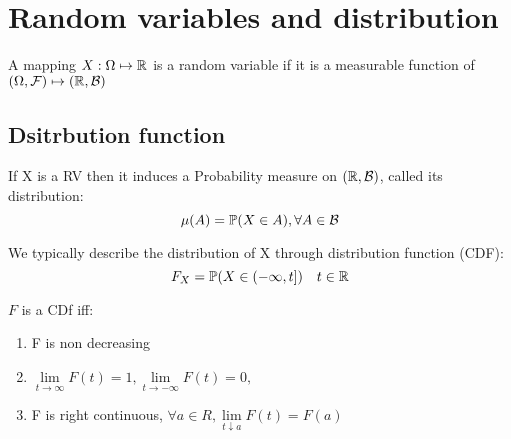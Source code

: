 \newpage
\section{Random variables and distribution}
\begin{dfn}
A mapping $X: \Omega \mapsto \mathbb{R}$ is a random variable if it is a measurable function of $(\Omega, \mathcal{F}) \mapsto (\mathbb{R}, \mathcal{B})$
\end{dfn}
\subsection{Dsitrbution function}
\begin{dfn}
If X is a RV then it induces a Probability measure on $(\mathbb{R}, \mathcal{B})$, called its distribution: 
\begin{equation*}
    \mu(A)=  \mathbb{P}(X\in A), \forall A\in \mathcal{B}
\end{equation*}
\end{dfn}
We typically describe the distribution of X through distribution function (CDF):
\begin{equation*}
    F_X = \mathbb{P}(X \in (-\infty, t]) \quad t\in \mathbb{R}
\end{equation*}
\begin{prop}
$F$ is a CDf iff:
\begin{enumerate}
    \item F is non decreasing
    \item $\lim\limits_{t\to \infty} F(t) = 1,\lim\limits_{t\to -\infty} F(t) = 0,$
    \item F is right continuous, $\forall a\in R, \lim\limits_{t\downarrow a}F(t) = F(a)$
\end{enumerate}
\end{prop}

